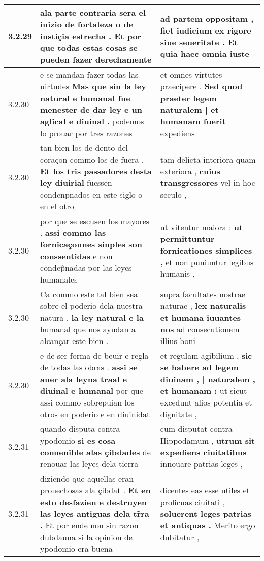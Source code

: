 \begin{tabular}{|p{1cm}|p{6.5cm}|p{6.5cm}|}
3.2.29 & ala parte contraria \textbf{ sera el iuizio de fortaleza o de iustiçia estrecha . } Et por que todas estas cosas se pueden fazer derechamente & ad partem oppositam , \textbf{ fiet iudicium ex rigore siue seueritate . } Et quia haec omnia iuste \\\hline
3.2.30 & e se mandan fazer todas las uirtudes \textbf{ Mas que sin la ley natural e humanal fue menester de dar ley e un aglical e diuinal . } podemos lo prouar por tres razones & et omnes virtutes praecipere . \textbf{ Sed quod praeter legem naturalem | et humanam fuerit } expediens \\\hline
3.2.30 & tan bien los de dento del coraçon commo los de fuera . \textbf{ Et los tris passadores desta ley diuirial } fuessen condenpnados en este siglo o en el otro & tam delicta interiora quam exteriora , \textbf{ cuius transgressores } vel in hoc seculo , \\\hline
3.2.30 & por que se escusen los mayores . \textbf{ assi commo las fornicaçonnes sinples son conssentidas } e non condep̃nadas por las leyes humanales & ut vitentur maiora : \textbf{ ut permittuntur fornicationes simplices , } et non puniuntur legibus humanis , \\\hline
3.2.30 & Ca commo este tal bien sea sobre el poderio dela nuestra natura . \textbf{ la ley natural e la } humanal que nos ayudan a alcançar este bien . & supra facultates nostrae naturae , \textbf{ lex naturalis et humana iuuantes nos } ad consecutionem illius boni \\\hline
3.2.30 & e de ser forma de beuir e regla de todas las obras . \textbf{ assi se auer ala leyna traal e diuinal e humanal } por que assi commo sobrepuian los otros en poderio e en diuinidat & et regulam agibilium , \textbf{ sic se habere ad legem diuinam , | naturalem , et humanam : } ut sicut excedunt alios potentia et dignitate , \\\hline
3.2.31 & quando disputa contra ypodomio \textbf{ si es cosa conuenible alas çibdades } de renouar las leyes dela tierra & cum disputat contra Hippodamum , \textbf{ utrum sit expediens ciuitatibus } innouare patrias leges , \\\hline
3.2.31 & diziendo que aquellas eran prouechosas ala çibdat . \textbf{ Et en esto desfazien e destruyen las leyes antiguas dela tr̃ra . } Et por ende non sin razon dubdauna si la opinion de ypodomio era buena & dicentes eas esse utiles et proficuas ciuitati , \textbf{ soluerent leges patrias et antiquas . } Merito ergo dubitatur , \\\hline

\end{tabular}
